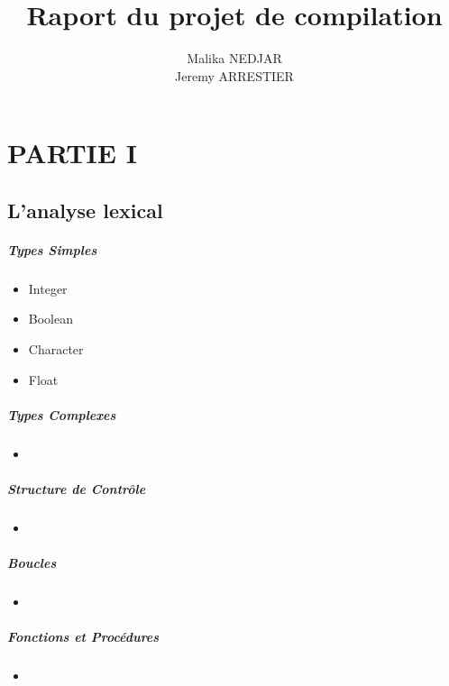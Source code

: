 \documentclass[10pt,a4paper]{report}
\author{ Malika NEDJAR \\ Jeremy ARRESTIER}
\title{Raport du projet de compilation}
\begin{document}
\maketitle

\chapter*{PARTIE I}

\section*{L'analyse lexical}

\paragraph{Types Simples}
\begin{itemize}
\item Integer 
\item Boolean
\item Character
\item Float
	
\end{itemize}

\paragraph{Types Complexes}
\begin{itemize}
\item 

\end{itemize}

\paragraph{Structure de Contrôle}
\begin{itemize}
\item 
\end{itemize}

\paragraph{Boucles}
\begin{itemize}

\item

\end{itemize}

\paragraph{Fonctions et Procédures}
\begin{itemize}

\item

\end{itemize}
\end{document}
